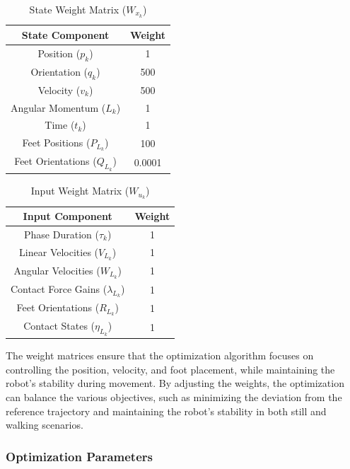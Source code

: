 \documentclass[main.tex]{subfiles}
\begin{document}
\begin{table}[htbp]
\centering
\renewcommand{\arraystretch}{1.5} %
\begin{tabular}{|c|c|}
\hline
\textbf{State Component} & \textbf{Weight} \\ \hline
Position (\(p_k\)) & 1 \\ \hline
Orientation (\(q_k\)) & 500 \\ \hline
Velocity (\(v_k\)) & 500 \\ \hline
Angular Momentum (\(L_k\)) & 1 \\ \hline
Time (\(t_k\)) & 1 \\ \hline
Feet Positions (\(P_L_k\)) & 100 \\ \hline
Feet Orientations (\(Q_L_k\)) & 0.0001 \\ \hline
\end{tabular}
\caption{State Weight Matrix (\(W_x_k\))}
\label{tab:state_weights}
\end{table}

\begin{table}[htbp]
\centering
\renewcommand{\arraystretch}{1.5} %
\begin{tabular}{|c|c|}
\hline
\textbf{Input Component} & \textbf{Weight} \\ \hline
Phase Duration (\(\tau_k\)) & 1 \\ \hline
Linear Velocities (\(V_L_k\)) & 1 \\ \hline
Angular Velocities (\(W_L_k\)) & 1 \\ \hline
Contact Force Gains (\(\lambda_L_k\)) & 1 \\ \hline
Feet Orientations (\(R_L_k\)) & 1 \\ \hline
Contact States (\(\eta_L_k\)) & 1 \\ \hline
\end{tabular}
\caption{Input Weight Matrix (\(W_u_k\))}
\label{tab:input_weights}
\end{table}

The weight matrices ensure that the optimization algorithm focuses on controlling the position, velocity, and foot placement, while maintaining the robot's stability during movement. By adjusting the weights, the optimization can balance the various objectives, such as minimizing the deviation from the reference trajectory and maintaining the robot's stability in both still and walking scenarios.

\subsubsection*{Optimization Parameters}
\end{document}
